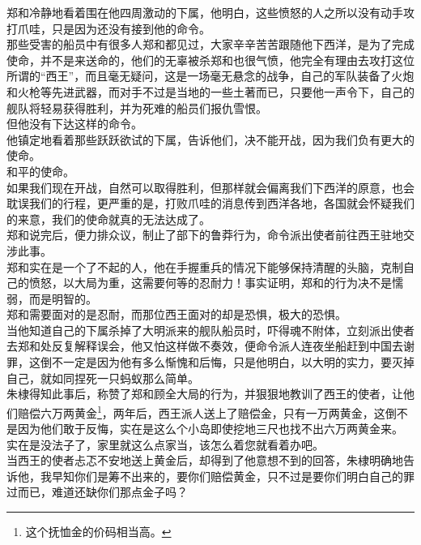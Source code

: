 \begin{multicols}{\theparacolNo}
郑和冷静地看着围在他四周激动的下属，他明白，这些愤怒的人之所以没有动手攻打爪哇，只是因为还没有接到他的命令。\\

那些受害的船员中有很多人郑和都见过，大家辛辛苦苦跟随他下西洋，是为了完成使命，并不是来送命的，他们的无辜被杀郑和也很气愤，他完全有理由去攻打这位所谓的“西王”，而且毫无疑问，这是一场毫无悬念的战争，自己的军队装备了火炮和火枪等先进武器，而对手不过是当地的一些土著而已，只要他一声令下，自己的舰队将轻易获得胜利，并为死难的船员们报仇雪恨。\\

但他没有下达这样的命令。\\

他镇定地看着那些跃跃欲试的下属，告诉他们，决不能开战，因为我们负有更大的使命。\\

和平的使命。\\

如果我们现在开战，自然可以取得胜利，但那样就会偏离我们下西洋的原意，也会耽误我们的行程，更严重的是，打败爪哇的消息传到西洋各地，各国就会怀疑我们的来意，我们的使命就真的无法达成了。\\

郑和说完后，便力排众议，制止了部下的鲁莽行为，命令派出使者前往西王驻地交涉此事。\\

郑和实在是一个了不起的人，他在手握重兵的情况下能够保持清醒的头脑，克制自己的愤怒，以大局为重，这需要何等的忍耐力！事实证明，郑和的行为决不是懦弱，而是明智的。\\

郑和需要面对的是忍耐，而那位西王面对的却是恐惧，极大的恐惧。\\

当他知道自己的下属杀掉了大明派来的舰队船员时，吓得魂不附体，立刻派出使者去郑和处反复解释误会，他又怕这样做不奏效，便命令派人连夜坐船赶到中国去谢罪，这倒不一定是因为他有多么惭愧和后悔，只是他明白，以大明的实力，要灭掉自己，就如同捏死一只蚂蚁那么简单。\\

朱棣得知此事后，称赞了郑和顾全大局的行为，并狠狠地教训了西王的使者，让他们赔偿六万两黄金\footnote{这个抚恤金的价码相当高。}，两年后，西王派人送上了赔偿金，只有一万两黄金，这倒不是因为他们敢于反悔，实在是这么个小岛即使挖地三尺也找不出六万两黄金来。\\

实在是没法子了，家里就这么点家当，该怎么着您就看着办吧。\\

当西王的使者忐忑不安地送上黄金后，却得到了他意想不到的回答，朱棣明确地告诉他，我早知你们是筹不出来的，要你们赔偿黄金，只不过是要你们明白自己的罪过而已，难道还缺你们那点金子吗？\\


\end{multicols}
